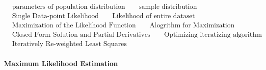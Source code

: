 \documentclass[
  12pt,
]{article}
\begin{document}
\begin{align*}
& \text{parameters of population distribution}\qquad\text{sample distribution} \\ 
& \text{Single Data-point Likelihood}\qquad\text{Likelihood of entire dataset} \\
& \text{Maximization of the Likelihood Function}\qquad\text{Alogrithm for Maximization} \\
& \text{Closed-Form Solution and Partial Derivatives}\qquad\text{Optimizing iteratizing algorithm} \\
& \text{Iteratively Re-weighted Least Squares}
\end{align*}

\hypertarget{maximum-likelihood-estimation}{%
\paragraph{Maximum Likelihood
Estimation}\label{maximum-likelihood-estimation}}
\end{document}

